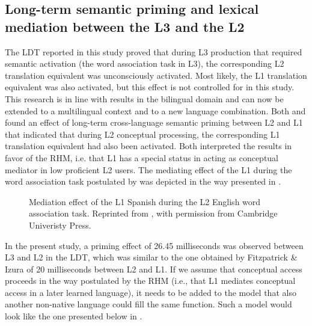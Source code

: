 \documentclass[output=paper,colorlinks,citecolor=brown,nonflat]{langsci/langscibook}
\begin{document}
\subsection{Long-term semantic priming and lexical mediation between the L3 and the L2}\label{sec:gudmundson:4.2}\largerpage

The LDT reported in this study proved that during L3 production that required semantic activation (the word association task in L3), the corresponding L2 translation equivalent was unconsciously activated. Most likely, the L1 translation equivalent was also activated, but this effect is not controlled for in this study. This research is in line with results in the bilingual domain and can now be extended to a multilingual context and to a new language combination. Both \citet{FitzpatrickIzura2011} and \citet{LiEtAl2009} found an effect of long-term cross-language semantic priming between L2 and L1 that indicated that during L2 conceptual processing, the corresponding L1 translation equivalent had also been activated. Both interpreted the results in favor of the RHM, i.e. that L1 has a special status in acting as conceptual mediator in low proficient L2 users. The mediating effect of the L1 during the word association task postulated by \citet{FitzpatrickIzura2011} was depicted in the way presented in .

\begin{figure}
    \caption{Mediation effect of the L1 Spanish during the L2 English word association task. Reprinted from \citet{FitzpatrickIzura2011}, with permission from Cambridge Univeristy Press.}
    \label{fig:gudmundson:6}
\end{figure}

In the present study, a priming effect of 26.45 milliseconds was observed between L3 and L2 in the LDT, which was similar to the one obtained by Fitzpatrick \& Izura of 20 milliseconds between L2 and L1. If we assume that conceptual access proceeds in the way postulated by the RHM (i.e., that L1 mediates conceptual access in a later learned language), it needs to be added to the model that also another non-native language could fill the same function. Such a model would look like the one presented below in .
\end{document}
